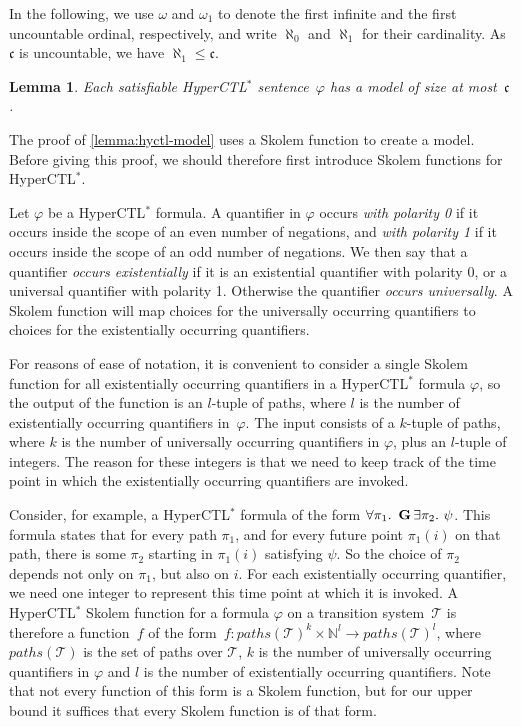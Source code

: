 \documentclass[dvipsnames,10pt,a4paper]{amsart}
\newtheorem{lem}[thm]{Lemma}
\theoremstyle{definition}
\theoremstyle{remark}
\renewcommand{\phi}{\varphi}
\newcommand{\cont}{\mathfrak{c}}
\newcommand{\tsys}{\mathcal{T}}
\newcommand{\G}{\mathop{\mathbf{G}\vphantom{a}}\nolimits}
\newcommand{\hyctlstar}{{HyperCTL$^*$}\xspace}
\renewcommand{\phi}{\varphi}
\begin{document}
In the following, we use $\omega$ and $\omega_1$ to denote the first infinite and the first uncountable ordinal, respectively, and write $\aleph_0$ and $\aleph_1$ for their cardinality. 
As $\cont$ is uncountable, we have $\aleph_1 \le \cont$.

\begin{lem}\label{lemma:hyctl-model}
Each satisfiable HyperCTL$^*$ sentence~$\phi$ has a model of size at most~$\cont$.
\end{lem}

The proof of \autoref{lemma:hyctl-model} uses a Skolem function to create a model. Before giving this proof, we should therefore first introduce Skolem functions for \hyctlstar.

Let $\phi$ be a \hyctlstar formula. A quantifier in $\phi$ occurs \emph{with polarity 0} if it occurs inside the scope of an even number of negations, and \emph{with polarity 1} if it occurs inside the scope of an odd number of negations. We then say that a quantifier \emph{occurs existentially} if it is an existential quantifier with polarity 0, or a universal quantifier with polarity 1. Otherwise the quantifier \emph{occurs universally}. A Skolem function will map choices for the universally occurring quantifiers to choices for the existentially occurring quantifiers.

For reasons of ease of notation, it is convenient to consider a single Skolem function for all existentially occurring quantifiers in a \hyctlstar formula $\phi$, so the output of the function is an $l$-tuple of paths, where $l$ is the number of existentially occurring quantifiers in~$\phi$. The input consists of a $k$-tuple of paths, where $k$ is the number of universally occurring quantifiers in $\phi$, plus an $l$-tuple of integers. The reason for these integers is that we need to keep track of the time point in which the existentially occurring quantifiers are invoked.

Consider, for example, a \hyctlstar formula of the form $\forall \pi_1.\ \G \exists \pi_2.\ \psi$. This formula states that for every path $\pi_1$, and for every future point $\pi_1(i)$ on that path, there is some $\pi_2$ starting in $\pi_1(i)$ satisfying $\psi$. So the choice of $\pi_2$ depends not only on $\pi_1$, but also on $i$. For each existentially occurring quantifier, we need one integer to represent this time point at which it is invoked. A \hyctlstar Skolem function for a formula $\phi$ on a transition system~$\tsys$ is therefore a function~$f$ of the form~$f\colon\mathit{paths}(\tsys)^k\times \mathbb{N}^l\rightarrow \mathit{paths}(\tsys)^l$, where $\mathit{paths}(\tsys)$ is the set of paths over $\tsys$, $k$ is the number of universally occurring quantifiers in $\phi$ and $l$ is the number of existentially occurring quantifiers. 
Note that not every function of this form is a Skolem function, but for our upper bound it suffices that every Skolem function is of that form.
\end{document}
